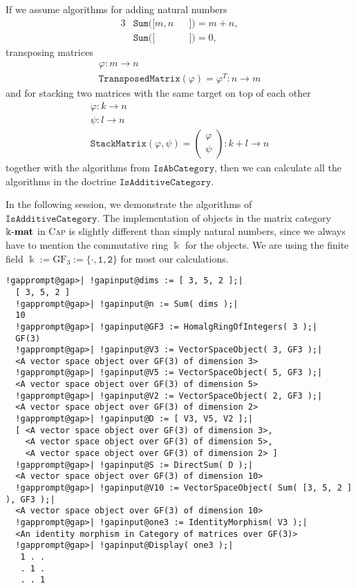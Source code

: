 \begin{computation} 
If we assume algorithms for adding natural numbers
\begin{alignat*}{3}
&\mathtt{Sum}( [ m, n &&] ) = m + n, \\
&\mathtt{Sum}( [  &&] ) = 0,
\end{alignat*}
transposing matrices
\begin{align*}
\varphi : m \rightarrow n \\
\mathtt{TransposedMatrix}( \varphi ) = \varphi^{T} : n \rightarrow m
\end{align*}
and for stacking two matrices with the same target on top of each other
\begin{align*}
\varphi : k \rightarrow n \\
\psi : l \rightarrow n\\
\mathtt{StackMatrix}( \varphi, \psi ) =
\begin{pmatrix}
\varphi \\
\psi
\end{pmatrix} : k + l \rightarrow n
\end{align*}
together with the algorithms from $\mathtt{IsAbCategory}$, then we can calculate all the algorithms in the doctrine $\mathtt{IsAdditiveCategory}$.

In the following \Gap{} session, we demonstrate the algorithms of\\
$\mathtt{IsAdditiveCategory}$.
The implementation of objects in the matrix category $\Bbbk\textnormal{-}\mathbf{mat}$ in \textsc{Cap} is slightly different than simply natural numbers, since
we always have to mention the commutative ring $\Bbbk$ for the objects. We are using the finite field
$\Bbbk := \mathrm{GF}_{3} := \{ \mathtt{ \cdot, 1, 2 } \}$ for most our calculations.
\begin{Verbatim}[commandchars=!@|,fontsize=\small,frame=single,label=Example]
  !gapprompt@gap>| !gapinput@dims := [ 3, 5, 2 ];|
  [ 3, 5, 2 ]
  !gapprompt@gap>| !gapinput@n := Sum( dims );|
  10
  !gapprompt@gap>| !gapinput@GF3 := HomalgRingOfIntegers( 3 );|
  GF(3)
  !gapprompt@gap>| !gapinput@V3 := VectorSpaceObject( 3, GF3 );|
  <A vector space object over GF(3) of dimension 3>
  !gapprompt@gap>| !gapinput@V5 := VectorSpaceObject( 5, GF3 );|
  <A vector space object over GF(3) of dimension 5>
  !gapprompt@gap>| !gapinput@V2 := VectorSpaceObject( 2, GF3 );|
  <A vector space object over GF(3) of dimension 2>
  !gapprompt@gap>| !gapinput@D := [ V3, V5, V2 ];|
  [ <A vector space object over GF(3) of dimension 3>,
    <A vector space object over GF(3) of dimension 5>,
    <A vector space object over GF(3) of dimension 2> ]
  !gapprompt@gap>| !gapinput@S := DirectSum( D );|
  <A vector space object over GF(3) of dimension 10>
  !gapprompt@gap>| !gapinput@V10 := VectorSpaceObject( Sum( [3, 5, 2 ] ), GF3 );|
  <A vector space object over GF(3) of dimension 10>
  !gapprompt@gap>| !gapinput@one3 := IdentityMorphism( V3 );|
  <An identity morphism in Category of matrices over GF(3)>
  !gapprompt@gap>| !gapinput@Display( one3 );|
   1 . .
   . 1 .
   . . 1
   

\end{Verbatim}
\end{computation}
